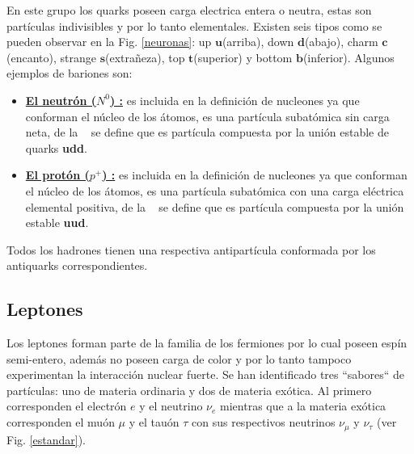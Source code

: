 En este grupo los quarks poseen carga electrica entera o neutra, estas son partículas indivisibles y por lo tanto elementales. Existen seis tipos como se pueden observar en la Fig. \ref{neuronas}: up $\mathbf{u}$(arriba), down $\mathbf{d}$(abajo), charm $\mathbf{c}$(encanto), strange $\mathbf{s}$(extrañeza), top $\mathbf{t}$(superior) y bottom $\mathbf{b}$(inferior). 
Algunos ejemplos de bariones son:
\begin{itemize}
    \item \href{https://es.wikipedia.org/wiki/Bari\%C3\%B3n_omega}{\textbf{El neutrón ($N^0$) :}} es incluida en la definición de nucleones ya que conforman el núcleo de los átomos, es una partícula subatómica sin carga neta,  de la \QCD ~ se define que es partícula compuesta por la unión estable de quarks \textbf{udd}.
    \item \href{https://es.wikipedia.org/wiki/Prot\%C3\%B3n}{\textbf{El protón ($p^+$) :}} es incluida en la definición de nucleones ya que conforman el núcleo de los átomos, es una partícula subatómica con una carga eléctrica elemental positiva, de la \QCD ~ se define que es partícula compuesta por la unión estable \textbf{uud}.
\end{itemize}

Todos los hadrones tienen una respectiva antipartícula conformada por los antiquarks correspondientes.

\subsection*{Leptones}

Los leptones forman parte de la familia de los fermiones por lo cual poseen espín semi-entero, además no poseen carga de color y por lo tanto tampoco experimentan la interacción nuclear fuerte. Se han identificado tres ``sabores`` de partículas: uno de materia ordinaria y dos de materia exótica. Al primero corresponden el electrón $e$ y el neutrino $\nu_e$ mientras que a la materia exótica corresponden el muón $\mu$ y el tauón $\tau$ con sus respectivos neutrinos $\nu_\mu$ y $\nu_\tau$ (ver Fig. \ref{estandar}).

